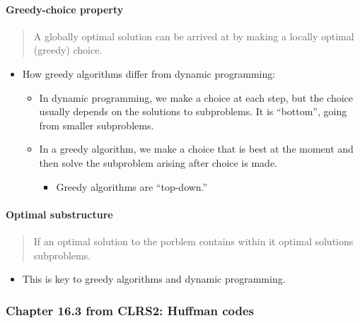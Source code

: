 \documentclass[a4paper,11pt]{article}
\begin{document}
\paragraph{Greedy-choice property}\label{greedy-choice-property}

\begin{quote}
A globally optimal solution can be arrived at by making a locally
optimal (greedy) choice.
\end{quote}

\begin{itemize}
\itemsep1pt\parskip0pt
\item
  How greedy algorithms differ from dynamic programming:

  \begin{itemize}
  \itemsep1pt\parskip0pt
  \item
    In dynamic programming, we make a choice at each step, but the
    choice usually depends on the solutions to subproblems. It is
    ``bottom'', going from smaller subproblems.
  \item
    In a greedy algorithm, we make a choice that is best at the moment
    and then solve the subproblem arising after choice is made.

    \begin{itemize}
    \itemsep1pt\parskip0pt
    \item
      Greedy algorithms are ``top-down.''
    \end{itemize}
  \end{itemize}
\end{itemize}

\paragraph{Optimal substructure}\label{optimal-substructure}

\begin{quote}
If an optimal solution to the porblem contains within it optimal
solutions subproblems.
\end{quote}

\begin{itemize}
\itemsep1pt\parskip0pt
\item
  This is key to greedy algorithms and dynamic programming.
\end{itemize}

\subsubsection{Chapter 16.3 from CLRS2: Huffman
codes}\label{chapter-16.3-from-clrs2-huffman-codes}
\end{document}
